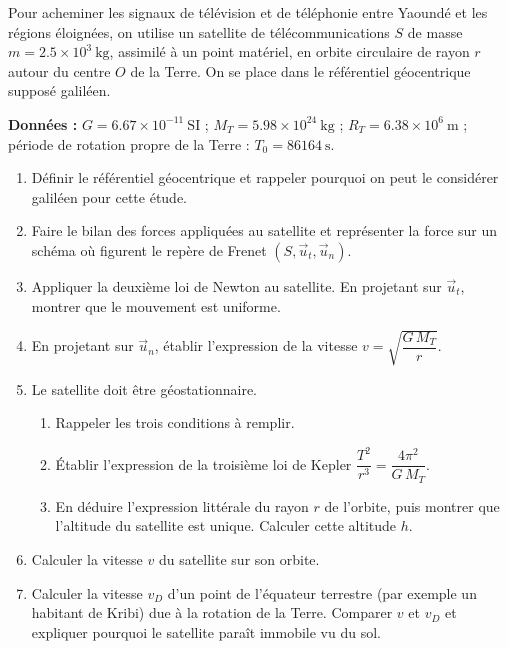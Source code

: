 \documentclass[11pt]{article}
\begin{document}
\begin{exercice}
Pour acheminer les signaux de télévision et de téléphonie entre Yaoundé et les régions éloignées, on utilise un satellite de télécommunications $S$ de masse $m = \num{2,5}\times 10^{3}\ \mathrm{kg}$, assimilé à un point matériel, en orbite circulaire de rayon $r$ autour du centre $O$ de la Terre. On se place dans le référentiel géocentrique supposé galiléen.

\textbf{Données :} $G = \num{6,67}\times 10^{-11}\ \mathrm{SI}$ ; $M_T = \num{5,98}\times 10^{24}\ \mathrm{kg}$ ; $R_T = \num{6,38}\times 10^{6}\ \mathrm{m}$ ; période de rotation propre de la Terre : $T_0 = \num{86164}\ \mathrm{s}$.
\begin{enumerate}
\item Définir le référentiel géocentrique et rappeler pourquoi on peut le considérer galiléen pour cette étude.
\item Faire le bilan des forces appliquées au satellite et représenter la force sur un schéma où figurent le repère de Frenet $(S, \vec{u}_t, \vec{u}_n)$.
\item Appliquer la deuxième loi de Newton au satellite. En projetant sur $\vec{u}_t$, montrer que le mouvement est uniforme.
\item En projetant sur $\vec{u}_n$, établir l'expression de la vitesse $v = \sqrt{\dfrac{G\,M_T}{r}}$.
\item Le satellite doit être géostationnaire.
\begin{enumerate}
\item Rappeler les trois conditions à remplir.
\item Établir l'expression de la troisième loi de Kepler $\dfrac{T^2}{r^3} = \dfrac{4\pi^2}{G\,M_T}$.
\item En déduire l'expression littérale du rayon $r$ de l'orbite, puis montrer que l'altitude du satellite est unique. Calculer cette altitude $h$.
\end{enumerate}
\item Calculer la vitesse $v$ du satellite sur son orbite.
\item Calculer la vitesse $v_D$ d'un point de l'équateur terrestre (par exemple un habitant de Kribi) due à la rotation de la Terre. Comparer $v$ et $v_D$ et expliquer pourquoi le satellite paraît immobile vu du sol.
\end{enumerate}
\end{exercice}
\end{document}
